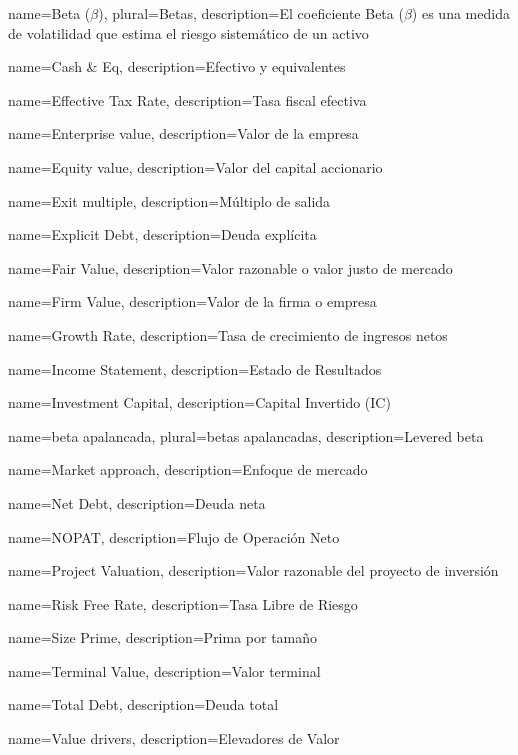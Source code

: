 {
        name=Beta ($\beta$),
        plural=Betas,
        description={El coeficiente Beta ($\beta$) es una medida de volatilidad que estima el riesgo sistem\'atico de un activo}
}

{
        name=Cash \& Eq,
        description={Efectivo y equivalentes}
}

{
        name=Effective Tax Rate,
        description={Tasa fiscal efectiva}
}

{
        name=Enterprise value,
        description={Valor de la empresa}
}

{
        name=Equity value,
        description={Valor del capital accionario}
}

{
        name=Exit multiple,
        description={M\'ultiplo de salida}
}

{
        name=Explicit Debt,
        description={Deuda expl\'icita}
}

{
        name=Fair Value,
        description={Valor razonable o valor justo de mercado}
}

{
        name=Firm Value,
        description={Valor de la firma o empresa}
}

{
        name=Growth Rate,
        description={Tasa de crecimiento de ingresos netos}
}

{
        name=Income Statement,
        description={Estado de Resultados}
}

{
        name=Investment Capital,
        description={Capital Invertido (IC)}
}

{
        name=beta apalancada,
        plural=betas apalancadas,
        description={Levered beta}
}

{
        name=Market approach,
        description={Enfoque de mercado}
}

{
        name=Net Debt,
        description={Deuda neta}
}

{
        name=NOPAT,
        description={Flujo de Operaci\'on Neto}
}

{
        name=Project Valuation,
        description={Valor razonable del proyecto de inversi\'on}
}

{
        name=Risk Free Rate,
        description={Tasa Libre de Riesgo}
}

{
        name=Size Prime,
        description={Prima por tama\~no}
}

{
        name=Terminal Value,
        description={Valor terminal}
}

{
        name=Total Debt,
        description={Deuda total}
}

{
        name=Value drivers,
        description={Elevadores de Valor}
}
